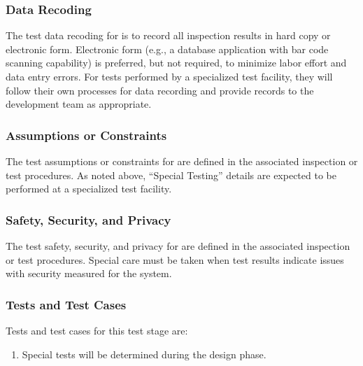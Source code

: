 \subsubsection{Data Recoding}
\label{loc:TestDataRecoding\TestIdName}

The test data recoding for \TestIdNameX is to record all inspection results in hard copy or electronic form.
Electronic form (e.g., a database application with bar code scanning capability) is preferred, but not required, to minimize labor effort and data entry errors.
For tests performed by a specialized test facility, they will follow their own processes for data recording and provide records to the development team as appropriate.

\subsubsection{Assumptions or Constraints}
\label{loc:TestAssumptionsOrConstraints\TestIdName}

The test assumptions or constraints for \TestIdNameX are defined in the associated inspection or test procedures.
As noted above, ``Special Testing'' details are expected to be performed at a specialized test facility.

\subsubsection{Safety, Security, and Privacy}
\label{loc:TestSafetySecurityPrivacy\TestIdName}

The test safety, security, and privacy for \TestIdNameX are defined in the associated inspection or test procedures.
Special care must be taken when test results indicate issues with security measured for the system.

\subsubsection{Tests and Test Cases}
\label{loc:TestsAndTestCases\TestIdName}

Tests and test cases for this test stage are:
\begin{enumerate}[itemindent=5pt,topsep=0pt,itemsep=0pt,partopsep=0pt, parsep=0pt]
	
	\item {\bf \TBD} Special tests will be determined during the design phase.

\end{enumerate}
